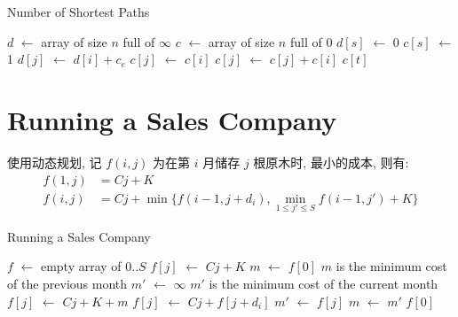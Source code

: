 \documentclass{ctexart}
\newcommand{\Let}[1]{\State #1 $\gets$}
\newcommand{\Ret}[1]{\State \textbf{return} #1}
\begin{document}
\begin{algorithm}[H]
    \caption{Number of Shortest Paths}
    \begin{algorithmic}
        \Let{$d$} array of size $n$ full of $\infty$
        \Let{$c$} array of size $n$ full of 0
        \Let{$d[s]$} 0
        \Let{$c[s]$} 1
                    \Let{$d[j]$} $d[i] + c_e$
                    \Let{$c[j]$} $c[i]$
                    \Let{$c[j]$} $c[j] + c[i]$
                \EndIf
            \EndFor
        \EndFor
        \Ret $c[t]$
        \EndFunction
    \end{algorithmic}
\end{algorithm}

\section{Running a Sales Company}

使用动态规划, 记 $f(i, j)$ 为在第 $i$ 月储存 $j$ 根原木时, 最小的成本, 则有:
\begin{align*}
    f(1, j) & = Cj+K                                                             \\
    f(i, j) & = Cj+\min\{f(i-1, j+d_i), \min\limits_{1\le j'\le S}f(i-1, j')+K\}
\end{align*}

\begin{algorithm}[H]
    \caption{Running a Sales Company}
    \begin{algorithmic}
        \Let{$f$} empty array of $0..S$
            \Let{$f[j]$} $Cj+K$
        \EndFor
        \Let{$m$} $f[0]$
        \Comment $m$ is the minimum cost of the previous month
            \Let{$m'$} $\infty$
            \Comment $m'$ is the minimum cost of the current month
                \Let{$f[j]$} $Cj+K+m$
                    \Let{$f[j]$} $Cj+f[j+d_i]$
                \EndIf
                    \Let{$m'$} $f[j]$
                \EndIf
            \EndFor
            \Let{$m$} $m'$
        \EndFor
        \Ret $f[0]$
        \EndFunction
    \end{algorithmic}
\end{algorithm}
\end{document}
